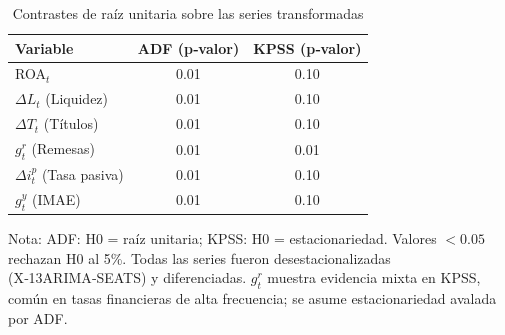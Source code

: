 \begin{table}[htbp]
  \centering
  \begin{threeparttable}
    \caption{Contrastes de raíz unitaria sobre las series transformadas}
    \label{tab:estacionariedad}
    \begin{tabular}{l c c}
      \toprule
      Variable & ADF (p‑valor) & KPSS (p‑valor) \\
      \midrule
      ROA$_t$                          & 0.01 & 0.10 \\
      $\Delta L_t$ (Liquidez)          & 0.01 & 0.10 \\
      $\Delta T_t$ (Títulos)           & 0.01 & 0.10 \\
      $g^r_t$ (Remesas)                & 0.01 & 0.01 \\
      $\Delta i^p_t$ (Tasa pasiva)     & 0.01 & 0.10 \\
      $g^y_t$ (IMAE)                   & 0.01 & 0.10 \\
      \bottomrule
    \end{tabular}
    \begin{tablenotes}
      \item Nota: ADF: H0 = raíz unitaria; KPSS: H0 = estacionariedad. Valores $<0.05$ rechazan H0 al 5\%. Todas las series fueron desestacionalizadas (X‑13ARIMA‑SEATS) y diferenciadas. $g^r_t$ muestra evidencia mixta en KPSS, común en tasas financieras de alta frecuencia; se asume estacionariedad avalada por ADF.
    \end{tablenotes}
  \end{threeparttable}
\end{table}
